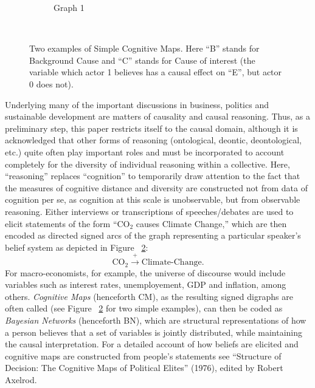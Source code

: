 \documentclass[12pt]{article}
\begin{document}
\begin{figure}
\begin{subfigure}[b]{0.3\textwidth}
                \caption{Graph 1}
                \label{fig:tiger}
        \end{subfigure}
        ~ %
        \caption{Two examples of Simple Cognitive Maps. Here ``B'' stands for Background Cause and ``C'' stands for Cause of interest (the variable which actor 1 believes has a causal effect on ``E'', but actor 0 does not).}\label{fig:animals}
\end{figure}

Underlying many of the important discussions in business, politics and sustainable development are matters of causality and causal reasoning. Thus, as a preliminary step, this paper restricts itself to the causal domain, although it is acknowledged that other forms of reasoning (ontological, deontic, deontological, etc.) quite often play important roles and must be incorporated to account completely for the diversity of individual reasoning within a collective. Here, ``reasoning'' replaces ``cognition'' to temporarily draw attention to the fact that the measures of cognitive distance and diversity are constructed not from data of cognition per se, as cognition at this scale is unobservable, but from observable reasoning. Either interviews or transcriptions of speeches/debates are used to elicit statements of the form ``CO$_2$ causes Climate Change,''  which are then encoded as directed signed arcs of the graph representing a particular speaker's belief system as depicted in Figure ~\ref{fig:animals}:
$$\text{CO}_2 \xrightarrow{+} \text{Climate-Change}.$$
For macro-economists, for example, the universe of discourse would include variables such as interest rates, unemployement, GDP and inflation, among others. \textit{Cognitive Maps} (henceforth CM), as the resulting signed digraphs are often called (see Figure ~\ref{fig:animals} for two simple examples), can then be coded as \textit{Bayesian Networks} (henceforth BN), which are structural representations of how a person believes that a set of variables is jointly distributed, while maintaining the causal interpretation.
For a detailed account of how beliefs are elicited and cognitive maps are constructed from people's statements see ``Structure of Decision: The Cognitive Maps of Political Elites'' (1976), edited by Robert Axelrod.\\
\end{document}
